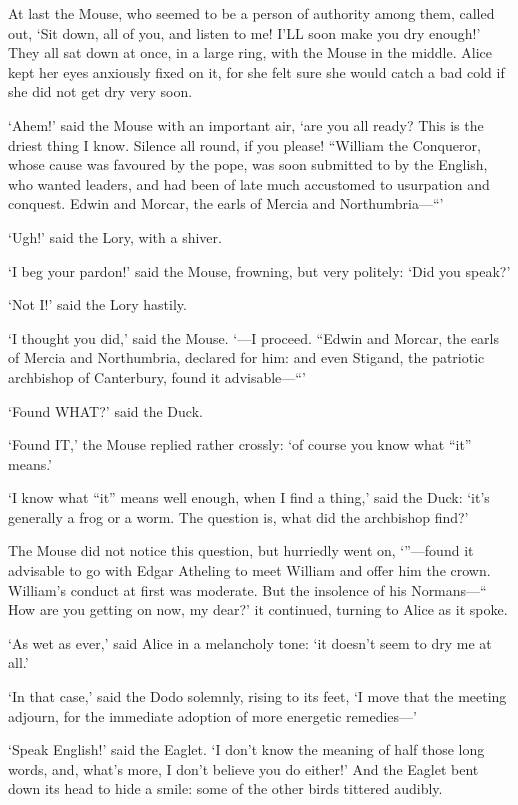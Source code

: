\documentclass[12pt]{book}
\begin{document}
\begin{Parallel}[p]{}{}
{At last the Mouse, who seemed to be a person of authority among them, called out, ‘Sit down, all of you, and listen to me! I’LL soon make you dry enough!’ They all sat down at once, in a large ring, with the Mouse in the middle. Alice kept her eyes anxiously fixed on it, for she felt sure she would catch a bad cold if she did not get dry very soon.

‘Ahem!’ said the Mouse with an important air, ‘are you all ready? This is the driest thing I know. Silence all round, if you please! “William the Conqueror, whose cause was favoured by the pope, was soon submitted to by the English, who wanted leaders, and had been of late much accustomed to usurpation and conquest. Edwin and Morcar, the earls of Mercia and Northumbria—“’

‘Ugh!’ said the Lory, with a shiver.

‘I beg your pardon!’ said the Mouse, frowning, but very politely: ‘Did you speak?’

‘Not I!’ said the Lory hastily.

‘I thought you did,’ said the Mouse. ‘—I proceed. “Edwin and Morcar, the earls of Mercia and Northumbria, declared for him: and even Stigand, the patriotic archbishop of Canterbury, found it advisable—“’

‘Found WHAT?’ said the Duck.

‘Found IT,’ the Mouse replied rather crossly: ‘of course you know what “it” means.’

‘I know what “it” means well enough, when I find a thing,’ said the Duck: ‘it’s generally a frog or a worm. The question is, what did the archbishop find?’

The Mouse did not notice this question, but hurriedly went on, ‘”—found it advisable to go with Edgar Atheling to meet William and offer him the crown. William’s conduct at first was moderate. But the insolence of his Normans—“ How are you getting on now, my dear?’ it continued, turning to Alice as it spoke.

‘As wet as ever,’ said Alice in a melancholy tone: ‘it doesn’t seem to dry me at all.’

‘In that case,’ said the Dodo solemnly, rising to its feet, ‘I move that the meeting adjourn, for the immediate adoption of more energetic remedies—’

‘Speak English!’ said the Eaglet. ‘I don’t know the meaning of half those long words, and, what’s more, I don’t believe you do either!’ And the Eaglet bent down its head to hide a smile: some of the other birds tittered audibly.

}
\end{Parallel}
\end{document}
